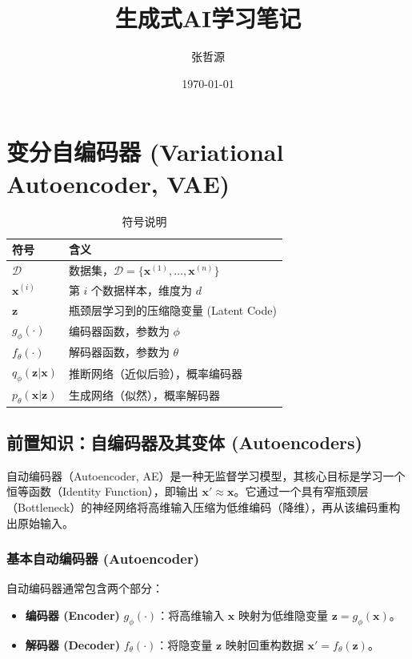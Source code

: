 \documentclass[zihao=-4, fontset=windows]{ctexart}
\title{生成式AI学习笔记}
\author{张哲源}
\date{\today}
\begin{document}
\maketitle

\section{变分自编码器 (Variational Autoencoder, VAE)}

\begin{table}[H]
	\centering
	\caption{符号说明}
	\begin{tabular}{ll}
		\toprule
		\textbf{符号} & \textbf{含义} \\
		\midrule
		$\mathcal{D}$ & 数据集，$\mathcal{D} = \{ \mathbf{x}^{(1)}, \dots, \mathbf{x}^{(n)} \}$ \\
		$\mathbf{x}^{(i)}$ & 第 $i$ 个数据样本，维度为 $d$ \\
		$\mathbf{z}$ & 瓶颈层学习到的压缩隐变量 (Latent Code) \\
		$g_\phi(\cdot)$ & 编码器函数，参数为 $\phi$ \\
		$f_\theta(\cdot)$ & 解码器函数，参数为 $\theta$ \\
		$q_\phi(\mathbf{z}|\mathbf{x})$ & 推断网络（近似后验），概率编码器 \\
		$p_\theta(\mathbf{x}|\mathbf{z})$ & 生成网络（似然），概率解码器 \\
		\bottomrule
	\end{tabular}
\end{table}

\subsection{前置知识：自编码器及其变体 (Autoencoders)}

\begin{definition}[自动编码器]
	自动编码器（Autoencoder, AE）是一种无监督学习模型，其核心目标是学习一个恒等函数（Identity Function），即输出 $\mathbf{x}' \approx \mathbf{x}$。它通过一个具有窄瓶颈层（Bottleneck）的神经网络将高维输入压缩为低维编码（降维），再从该编码重构出原始输入。
\end{definition}

\subsubsection{基本自动编码器 (Autoencoder)}
自动编码器通常包含两个部分：
\begin{itemize}
	\item \textbf{编码器 (Encoder)} $g_\phi(\cdot)$：将高维输入 $\mathbf{x}$ 映射为低维隐变量 $\mathbf{z} = g_\phi(\mathbf{x})$。
	\item \textbf{解码器 (Decoder)} $f_\theta(\cdot)$：将隐变量 $\mathbf{z}$ 映射回重构数据 $\mathbf{x}' = f_\theta(\mathbf{z})$。
\end{itemize}
\end{document}
